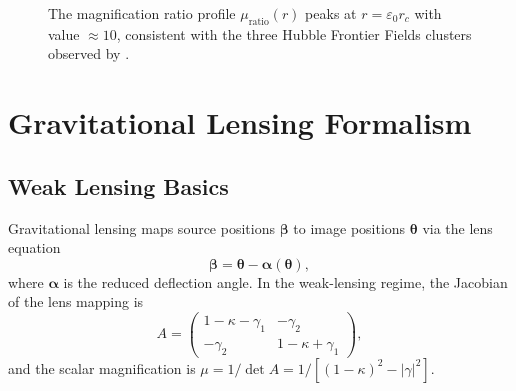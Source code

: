 \documentclass[11pt,a4paper,openright]{book}
\theoremstyle{dm3thm}
\theoremstyle{dm3def}
\newcommand{\eps}{\varepsilon_0}
\newcommand{\rc}{r_c}
\begin{document}
\begin{figure}[htbp]
\centering
{}
\caption{The magnification ratio profile $\mu_{\mathrm{ratio}}(r)$ peaks at
  $r=\eps\rc$ with value $\approx 10$, consistent with the three Hubble
  Frontier Fields clusters observed by \citet{NatarajanChiangDutra2026}.}
\label{fig:muratio}
\end{figure}

\chapter{Gravitational Lensing Formalism}
\label{ch:formalism}

\section{Weak Lensing Basics}

Gravitational lensing maps source positions $\bm\beta$ to image positions
$\bm\theta$ via the lens equation
\[
  \bm\beta = \bm\theta - \bm\alpha(\bm\theta),
\]
where $\bm\alpha$ is the reduced deflection angle.  In the weak-lensing regime,
the Jacobian of the lens mapping is
\[
  A = \begin{pmatrix} 1-\kappa-\gamma_1 & -\gamma_2 \\
                      -\gamma_2 & 1-\kappa+\gamma_1 \end{pmatrix},
\]
and the scalar magnification is $\mu = 1/\det A = 1/[(1-\kappa)^2 - |\gamma|^2]$.
\end{document}
